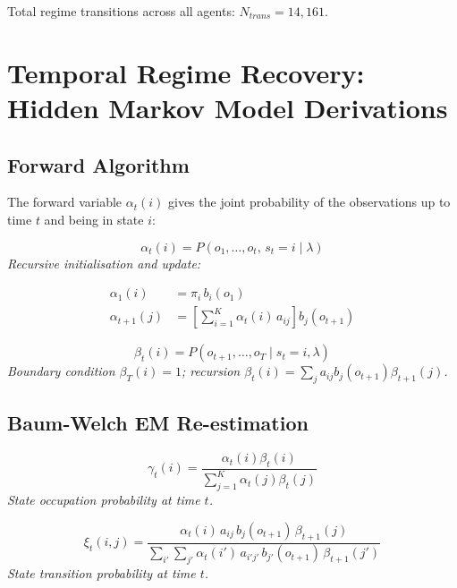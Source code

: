 \documentclass[12pt]{article}
\begin{document}
Total regime transitions across all agents: $N_{trans} = 14,161$.



\section{Temporal Regime Recovery: Hidden Markov Model Derivations}


\subsection{Forward Algorithm}

The forward variable $\alpha_t(i)$ gives the joint probability of
the observations up to time $t$ and being in state $i$:

\begin{equation}
\alpha_t(i) = P(o_1,\ldots,o_t,\,s_t=i\mid\lambda)
\end{equation}
\noindent\textit{Recursive initialisation and update:}



\begin{align}
\alpha_1(i) &= \pi_i\,b_i(o_1) \\
\alpha_{t+1}(j) &= \left[\sum_{i=1}^{K}
  \alpha_t(i)\,a_{ij}\right]b_j(o_{t+1})
\end{align}

\begin{equation}
\beta_t(i) = P(o_{t+1},\ldots,o_T\mid s_t=i,\lambda)
\end{equation}
\noindent\textit{Boundary condition $\beta_T(i) = 1$; recursion $\beta_t(i) = \sum_j a_{ij}b_j(o_{t+1})\beta_{t+1}(j)$.}



\subsection{Baum-Welch EM Re-estimation}

\begin{equation}
\gamma_t(i) = \frac{\alpha_t(i)\beta_t(i)}{\sum_{j=1}^{K}\alpha_t(j)\beta_t(j)}
\end{equation}
\noindent\textit{State occupation probability at time $t$.}


\begin{equation}
\xi_t(i,j) = \frac{\alpha_t(i)\,a_{ij}\,b_j(o_{t+1})\,\beta_{t+1}(j)}{\sum_{i'}\sum_{j'}\alpha_t(i')\,a_{i'j'}\,b_{j'}(o_{t+1})\,\beta_{t+1}(j')}
\end{equation}
\noindent\textit{State transition probability at time $t$.}
\end{document}
